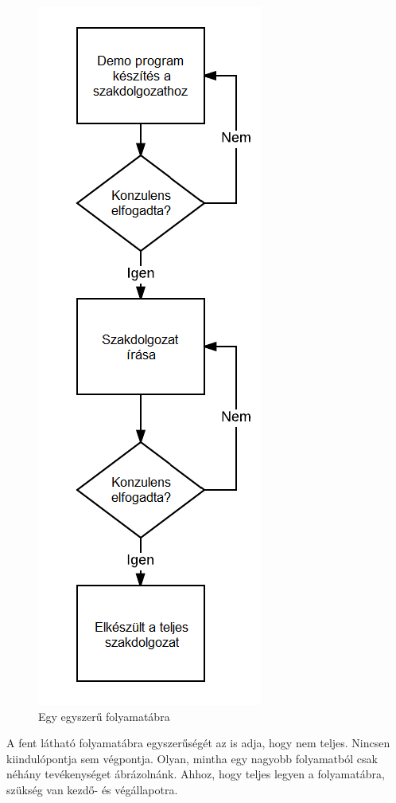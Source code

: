 \begin{figure}[h]
\centering
\includegraphics[scale=0.7]{images/folyamatabra.png}
\caption{Egy egyszerű folyamatábra}
\label{fig:folyamata}
\end{figure}

\newpage %

A fent látható folyamatábra egyszerűségét az is adja, hogy nem teljes. Nincsen kiindulópontja sem végpontja. Olyan, mintha egy nagyobb folyamatból csak néhány tevékenységet ábrázolnánk. Ahhoz, hogy teljes legyen a folyamatábra, szükség van kezdő- és végállapotra.

